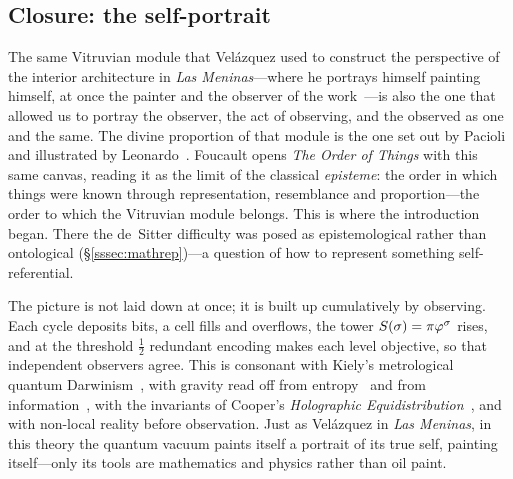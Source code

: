 \subsection{Closure: the self-portrait}\label{ssec:disc-closure}

The same Vitruvian module that Vel\'azquez used to construct the perspective of the interior architecture in \emph{Las Meninas}---where he portrays himself painting himself, at once the painter and the observer of the work~\cite{Foucault66}---is also the one that allowed us to portray the observer, the act of observing, and the observed as one and the same. The divine proportion of that module is the one set out by Pacioli and illustrated by Leonardo~\cite{pacioli1509}. Foucault opens \emph{The Order of Things} with this same canvas, reading it as the limit of the classical \emph{episteme}: the order in which things were known through representation, resemblance and proportion---the order to which the Vitruvian module belongs. This is where the introduction began. There the de~Sitter difficulty was posed as epistemological rather than ontological (\S\ref{sssec:mathrep})---a question of how to represent something self-referential.

The picture is not laid down at once; it is built up cumulatively by observing. Each cycle deposits bits, a cell fills and overflows, the tower $S(\sigma)=\pi\varphi^\sigma$ rises, and at the threshold $\tfrac12$ redundant encoding makes each level objective, so that independent observers agree. This is consonant with Kiely's metrological quantum Darwinism~\cite{Kiely26}, with gravity read off from entropy~\cite{Jacobson1995} and from information~\cite{Verlinde2011,Verlinde2017}, with the invariants of Cooper's \emph{Holographic Equidistribution}~\cite{Cooper2026}, and with non-local reality before observation. Just as Vel\'azquez in \emph{Las Meninas}, in this theory the quantum vacuum paints itself a portrait of its true self, painting itself---only its tools are mathematics and physics rather than oil paint.

\FloatBarrier
